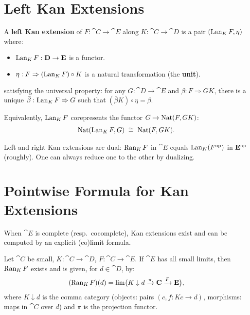 \section{Left Kan Extensions}

\begin{definition}
A \textbf{left Kan extension} of $F: \cat{C} \to \cat{E}$ along $K: \cat{C} \to \cat{D}$ is a pair $(\operatorname{Lan}_K F, \eta)$ where:
\begin{itemize}
  \item $\operatorname{Lan}_K F: \mathbf{D} \to \mathbf{E}$ is a functor.
  \item $\eta: F \Rightarrow (\operatorname{Lan}_K F) \circ K$ is a natural transformation (the \textbf{unit}).
\end{itemize}
satisfying the universal property: for any $G: \cat{D} \to \cat{E}$ and $\beta: F \Rightarrow GK$, there is a unique $\bar\beta: \operatorname{Lan}_K F \Rightarrow G$ such that $(\bar\beta K) \circ \eta = \beta$.

Equivalently, $\operatorname{Lan}_K F$ corepresents the functor $G \mapsto \operatorname{Nat}(F, GK)$:
\[
  \operatorname{Nat}(\operatorname{Lan}_K F, G) \;\cong\; \operatorname{Nat}(F, GK).
\]
\end{definition}

\begin{remark}[Duality]
Left and right Kan extensions are dual: $\operatorname{Ran}_K F$ in $\cat{E}$ equals $\operatorname{Lan}_K (F^{\mathrm{op}})$ in $\mathbf{E}^{\mathrm{op}}$ (roughly). One can always reduce one to the other by dualizing.
\end{remark}

\section{Pointwise Formula for Kan Extensions}

When $\cat{E}$ is complete (resp.\ cocomplete), Kan extensions exist and can be computed by an explicit (co)limit formula.

\begin{theorem}
\label{thm:pointwise-ran}
Let $\cat{C}$ be small, $K: \cat{C} \to \cat{D}$, $F: \cat{C} \to \cat{E}$. If $\cat{E}$ has all small limits, then $\operatorname{Ran}_K F$ exists and is given, for $d \in \cat{D}$, by:
\[
  (\operatorname{Ran}_K F)(d) = \lim\bigl(K \downarrow d \xrightarrow{\pi} \mathbf{C} \xrightarrow{F} \mathbf{E}\bigr),
\]
where $K \downarrow d$ is the comma category (objects: pairs $(c, f: Kc \to d)$, morphisms: maps in $\cat{C}$ over $d$) and $\pi$ is the projection functor.
\end{theorem}


